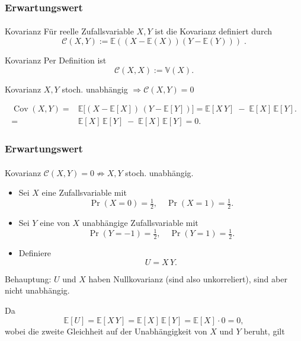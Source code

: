 \documentclass{beamer}
\begin{document}
 \begin{frame}
    \frametitle{Erwartungswert}
\framesubtitle{}
\begin{block}{Kovarianz}
Für  reelle Zufallsvariable $X,Y$ ist die Kovarianz definiert durch
$$ \mathcal{C} (X,Y) :=  \mathbb{E}( (X - \mathbb{E}(X)) (Y - \mathbb{E}(Y))) \; .$$
\end{block}

\begin{block}{Kovarianz}
    Per Definition ist
    $$ \mathcal{C} (X,X) :=  \mathbb{V}(X).$$
    \end{block}
    \begin{block}{Kovarianz}
        $X,Y$ stoch. unabhängig
        $ \Rightarrow \mathcal{C} (X,Y) =  0$
        \end{block}
            \begin{align*}
            \operatorname{Cov}(X,Y)
            = &\mathbb{E}\bigl[(X - \mathbb{E}[X])\,(Y - \mathbb{E}[Y])\bigr] 
            = \mathbb{E}[X\,Y] \;-\; \mathbb{E}[X]\,\mathbb{E}[Y].\\
             = &\mathbb{E}[X]\,\mathbb{E}[Y] \;-\; \mathbb{E}[X]\,\mathbb{E}[Y]
            = 0.
        \end{align*}
 \end{frame}

 \begin{frame}
    \frametitle{Erwartungswert}
\framesubtitle{}

    \begin{block}{Kovarianz}
        $ \mathcal{C} (X,Y) =  0    \nRightarrow     X,Y$ stoch. unabhängig.
        \end{block}

        \begin{itemize}
            \item Sei $X$ eine Zufallsvariable mit
              \[
                \Pr(X=0)=\tfrac12,\quad \Pr(X=1)=\tfrac12.
              \]
            \item Sei $Y$ eine von $X$ unabhängige Zufallsvariable mit
              \[
                \Pr(Y=-1)=\tfrac12,\quad \Pr(Y=1)=\tfrac12.
              \]
            \item Definiere
              \[
                U = X\,Y.
              \]
          \end{itemize}
          
          Behauptung: $U$ und $X$ haben Nullkovarianz (sind also unkorreliert), sind aber nicht unabhängig.
          
          \medskip
          
          Da
          \[
            \mathbb{E}[U]
            = \mathbb{E}[X\,Y]
            = \mathbb{E}[X]\,\mathbb{E}[Y]
            = \mathbb{E}[X]\cdot 0
            = 0,
          \]
          wobei die zweite Gleichheit auf der Unabhängigkeit von $X$ und $Y$ beruht, gilt
          
                  
\end{frame}
 
\end{document}
